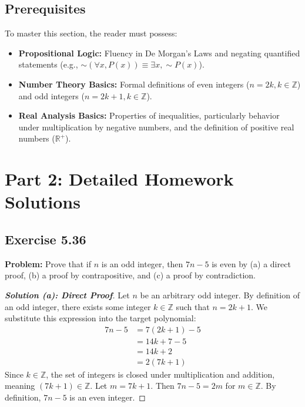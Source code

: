 \documentclass[11pt, a4paper]{article}
\theoremstyle{definition}
\theoremstyle{remark}
\newcommand{\R}{\mathbb{R}}
\newcommand{\Z}{\mathbb{Z}}
\begin{document}
\subsection{Prerequisites}
To master this section, the reader must possess:
\begin{itemize}
    \item \textbf{Propositional Logic:} Fluency in De Morgan's Laws and negating quantified statements (e.g., $\sim(\forall x, P(x)) \equiv \exists x, \sim P(x)$).
    \item \textbf{Number Theory Basics:} Formal definitions of even integers ($n = 2k, k \in \Z$) and odd integers ($n = 2k+1, k \in \Z$).
    \item \textbf{Real Analysis Basics:} Properties of inequalities, particularly behavior under multiplication by negative numbers, and the definition of positive real numbers ($\R^+$).
\end{itemize}

\section{Part 2: Detailed Homework Solutions}

\subsection{Exercise 5.36}
\textbf{Problem:} Prove that if $n$ is an odd integer, then $7n - 5$ is even by (a) a direct proof, (b) a proof by contrapositive, and (c) a proof by contradiction.

\begin{proof}[\textbf{Solution (a): Direct Proof}]
Let $n$ be an arbitrary odd integer. By definition of an odd integer, there exists some integer $k \in \Z$ such that $n = 2k + 1$. We substitute this expression into the target polynomial:
\begin{align*}
    7n - 5 &= 7(2k + 1) - 5 \\
           &= 14k + 7 - 5 \\
           &= 14k + 2 \\
           &= 2(7k + 1)
\end{align*}
Since $k \in \Z$, the set of integers is closed under multiplication and addition, meaning $(7k + 1) \in \Z$. Let $m = 7k + 1$. Then $7n - 5 = 2m$ for $m \in \Z$. By definition, $7n - 5$ is an even integer.
\end{proof}
\end{document}
